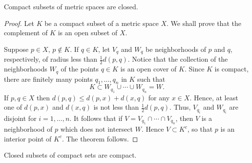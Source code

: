 \begin{theorem}\label{thm:compact_implies_closed}
    Compact subsets of metric spaces are closed.
\end{theorem}
\begin{proof}
Let $K$ be a compact subset of a metric space $X$.
We shall prove that the complement of $K$ is an open subset of $X$.

Suppose $p \in X$, $p \notin K$.
If $q \in K$, let $V_q$ and $W_q$ be neighborhoods of $p$ and $q$, respectively, of radius less than $\frac{1}{2}d(p,q)$.
Notice that the collection of the neighborhoods $W_q$ of the points $q \in K$ is an open cover of $K$.
Since $K$ is compact, there are finitely many points $q_1, \ldots, q_n$ in $K$ such that
\[
K \subset W_{q_1} \cup \cdots \cup W_{q_n}=W.
\]
If $p,q \in X$ then $d(p,q) \leq d(p,x)+d(x,q)$ for any $x \in X$. 
Hence, at least one of $d(p,x)$ and $d(x,q)$ is not less than $\frac{1}{2}d(p,q)$.
Thus, $V_{q_i}$ and $W_{q_i}$ are disjoint for $i=1,\ldots,n$.
It follows that if $V=V_{q_1}\cap \cdots \cap V_{q_n}$, then $V$ is a neighborhood of $p$ which does not intersect $W$.
Hence $V \subset K^c$, so that $p$ is an interior point of $K^c$. The theorem follows.
\end{proof}

\begin{theorem}\label{thm:closed_implies_compact}
Closed subsets of compact sets are compact.
\end{theorem}

